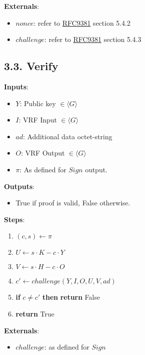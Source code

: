 \documentclass[
]{article}
\providecommand{\tightlist}{%
  \setlength{\itemsep}{0pt}\setlength{\parskip}{0pt}}
\begin{document}
\textbf{Externals}:

\begin{itemize}
\tightlist
\item
  \(nonce\): refer to
  \href{https://datatracker.ietf.org/doc/rfc9381}{RFC9381} section 5.4.2
\item
  \(challenge\): refer to
  \href{https://datatracker.ietf.org/doc/rfc9381}{RFC9381} section 5.4.3
\end{itemize}

\hypertarget{verify}{%
\subsection{3.3. Verify}\label{verify}}

\textbf{Inputs}:

\begin{itemize}
\tightlist
\item
  \(Y\): Public key \(\in \langle G \rangle\)
\item
  \(I\): VRF Input \(\in \langle G \rangle\)
\item
  \(ad\): Additional data octet-string
\item
  \(O\): VRF Output \(\in \langle G \rangle\)
\item
  \(\pi\): As defined for \(Sign\) output.
\end{itemize}

\textbf{Outputs}:

\begin{itemize}
\tightlist
\item
  True if proof is valid, False otherwise.
\end{itemize}

\textbf{Steps}:

\begin{enumerate}
\def\labelenumi{\arabic{enumi}.}
\tightlist
\item
  \((c, s) \leftarrow \pi\)
\item
  \(U \leftarrow s \cdot K - c \cdot Y\)
\item
  \(V \leftarrow s \cdot H - c \cdot O\)
\item
  \(c' \leftarrow challenge(Y, I, O, U, V, ad)\)
\item
  \textbf{if} \(c \neq c'\) \textbf{then} \textbf{return} False
\item
  \textbf{return} True
\end{enumerate}

\textbf{Externals}:

\begin{itemize}
\tightlist
\item
  \(challenge\): as defined for \(Sign\)
\end{itemize}
\end{document}
